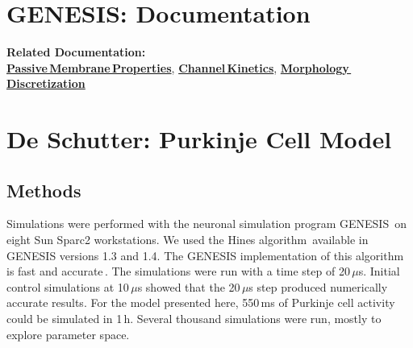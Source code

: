 \documentclass[12pt]{article}
\begin{document}
\section*{GENESIS: Documentation}

{\bf Related Documentation:}\\
\href{../pub-purkinje-deschutter1-passive/pub-purkinje-deschutter1-passive.tex}{\bf Passive\,Membrane\,Properties},
\href{../pub-purkinje-deschutter1-table1/pub-purkinje-deschutter1-table1.tex}{\bf Channel\,Kinetics},
\href{../pub-purkinje-deschutter1-discretization/pub-purkinje-deschutter1-discretization.tex}{\bf Morphology\,Discretization}

\section*{De Schutter: Purkinje Cell Model}

\subsection*{Methods}

Simulations were performed with the neuronal simulation program
GENESIS\,\cite{Wilson:1989ff} on eight Sun Sparc2 workstations.
We used the Hines algorithm\,\cite{hines84:_effic} available in
GENESIS versions 1.3 and 1.4. The GENESIS implementation of
this algorithm is fast and accurate\,\cite{bhalla92:_rallp}. The simulations
were run with a time step of 20\,$\mu$s. Initial control simulations
at 10\,$\mu$s showed that the 20\,$\mu$s step produced numerically accurate
results. For the model presented here, 550\,ms of Purkinje cell
activity could be simulated in 1\,h. Several thousand simulations
were run, mostly to explore parameter space.



\end{document}
